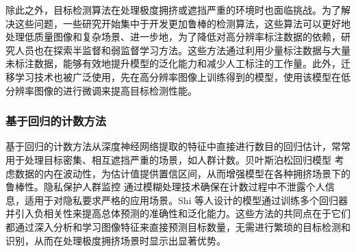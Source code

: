 除此之外，目标检测算法在处理极度拥挤或遮挡严重的环境时也面临挑战。为了解决这些问题，一些研究\cite{2023LowResolutionSelfAttentionSemanticSegmentation}开始集中于开发更加鲁棒的检测算法，这些算法可以更好地处理低质量图像和复杂场景、进一步地，为了降低对高分辨率标注数据的依赖，研究人员也在探索半监督和弱监督学习方法\cite{2023SelfsupervisedFewshotLearningSemanticSegmentationAnnotationfreeApproach}。这些方法通过利用少量标注数据与大量未标注数据，能够有效地提升模型的泛化能力和减少人工标注的工作量。此外，迁移学习技术\cite{2021TransferLearningUNetDeepLearningLungUltrasoundSegmentation}也被广泛使用，先在高分辨率图像上训练得到的模型，使用该模型在低分辨率图像的进行微调来提高目标检测性能。


\subsubsection{基于回归的计数方法}
基于回归的计数方法\cite{2022Crowddetectionanalysissurveillancevideosusingdeeplearning}\cite{2008PrivacypreservingcrowdmonitoringCountingpeoplepeoplemodelstracking}\cite{2009BayesianPoissonRegressionCrowdCounting}从深度神经网络提取的特征中直接进行数目的回归估计，常常用于处理目标密集、相互遮挡严重的场景，如人群计数。贝叶斯泊松回归模型\cite{2009BayesianPoissonRegressionCrowdCounting} 考虑数据的内在波动性，为估计值提供置信区间，从而增强模型在各种拥挤场景下的鲁棒性。隐私保护人群监控\cite{2008PrivacypreservingcrowdmonitoringCountingpeoplepeoplemodelstracking} 通过模糊处理技术确保在计数过程中不泄露个人信息，适用于对隐私要求严格的应用场景。Shi 等人\cite{2018CrowdCountingDeepNegativeCorrelationLearning}设计的模型通过训练多个回归器并引入负相关性来提高总体预测的准确性和泛化能力。这些方法的共同点在于它们都通过深入分析和学习图像特征来直接预测目标数量，无需进行繁琐的目标检测和识别，从而在处理极度拥挤场景时显示出显著优势。
